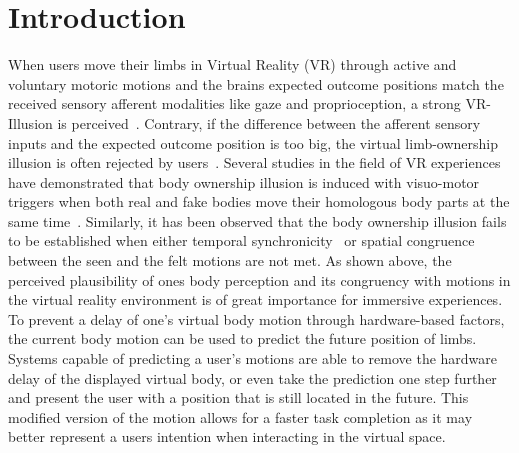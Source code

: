 \documentclass[sigconf]{acmart}
\begin{document}




\maketitle

\section{Introduction}\label{tit:Introduction}
When users move their limbs in Virtual Reality (VR) through active and voluntary motoric motions and the brains expected outcome positions match the received sensory afferent modalities like gaze and proprioception, a strong VR-Illusion is perceived~\cite{Gonzalez-Franco2017}.
Contrary, if the difference between the afferent sensory inputs and the expected outcome position is too big, the virtual limb-ownership illusion is often rejected by users~\cite{Gonzalez-Franco2017}.
Several studies in the field of VR experiences have demonstrated that body ownership illusion is induced with visuo-motor triggers when both real and fake bodies move their homologous body parts at the same time~\cite{Banakou2013, Kilteni2013}.
Similarly, it has been observed that the body ownership illusion fails to be established when either temporal synchronicity~\cite{Shimada2010} or spatial congruence~\cite{Dummer2009} between the seen and the felt motions are not met. 
As shown above, the perceived plausibility of ones body perception and its congruency with motions in the virtual reality environment is of great importance for immersive experiences.
To prevent a delay of one’s virtual body motion through hardware-based factors, the current body motion can be used to predict the future position of limbs. 
Systems capable of predicting a user's motions are able to remove the hardware delay of the displayed virtual body, or even take the prediction one step further and present the user with a position that is still located in the future. 
This modified version of the motion allows for a faster task completion as it may better represent a users intention when interacting in the virtual space.\\
\end{document}
